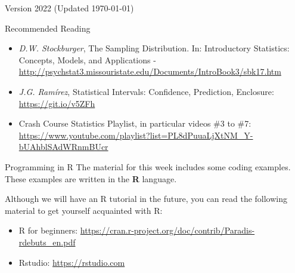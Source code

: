 \documentclass[aspectratio=169]{beamer}
\subtitle[Statistical Indicators]{Topic 02 - Point and Interval Indicators}
\begin{document}
\begin{CJK}{UTF8}{ipxm}

\begin{frame}
  \maketitle

  \vfill

  \hfill \tiny{Version 2022 (Updated \today)}
\end{frame}




\begin{frame}{Recommended Reading}
  \begin{itemize}
    \item \emph{D.W. Stockburger}, The Sampling Distribution. In: Introductory Statistics: Concepts, Models, and Applications -
    \url{http://psychstat3.missouristate.edu/Documents/IntroBook3/sbk17.htm}
    \item \emph{J.G. Ramírez}, Statistical Intervals: Confidence, Prediction, Enclosure: \url{https://git.io/v5ZFh}
    \item Crash Course Statistics Playlist, in particular videos \#3 to \#7: \url{https://www.youtube.com/playlist?list=PL8dPuuaLjXtNM_Y-bUAhblSAdWRnmBUcr}
  \end{itemize}
\end{frame}

\begin{frame}{Programming in R}
  The material for this week includes some coding examples. These examples are
  written in the {\bf R} language.\bigskip

  Although we will have an R tutorial in the future, you can read the
  following material to get yourself acquainted with R:\bigskip

  \begin{itemize}
    \item R for beginners: \url{https://cran.r-project.org/doc/contrib/Paradis-rdebuts_en.pdf}
    \item Rstudio: \url{https://rstudio.com}
  \end{itemize}
\end{frame}


\end{CJK}
\end{document}
